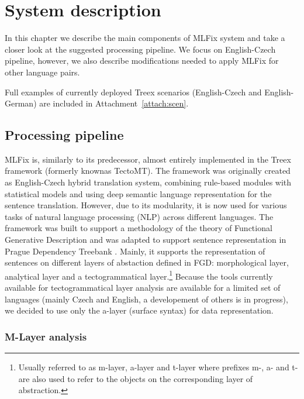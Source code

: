\chapter{System description}
\label{chap:system_descr}

In this chapter we describe the main components
of MLFix system and take a closer look at the suggested processing pipeline.
We focus on English-Czech pipeline, however, we also describe modifications
needed to apply MLFix for other language pairs.

Full examples of currently deployed Treex scenarios (English-Czech and English-German)
are included in Attachment~\ref{attach:scen}.


\section{Processing pipeline}

MLFix is, similarly to its predecessor, almost entirely implemented in the
Treex \citep{Popel:2010:TMN:1884371.1884406}
framework (formerly knownas TectoMT).
The framework was originally created as English-Czech hybrid translation system, combining
rule-based modules with statistical models and using deep semantic language representation
for the sentence translation. However, due to its modularity, it is
now used for various tasks of natural language processing (NLP) across different
languages. The framework was built to support a methodology of the theory of Functional Generative Description \citep{Sgall1967}
and was adapted to support sentence representation in Prague Dependency Treebank \citep{pdt20:2006}.
Mainly, it supports the representation of sentences on different layers of abstaction defined in FGD: morphological layer,
analytical layer and a tectogrammatical layer.\footnote{Usually referred to as m-layer, a-layer and t-layer where prefixes m-, a- and t- are also used to refer to the objects on the corresponding layer of abstraction.}
Because the tools currently available for tectogrammatical layer analysis are available for
a limited set of languages (mainly Czech and English, a developement of others is in progress),
we decided to use only the a-layer (surface syntax) for data representation.

\subsection{M-Layer analysis}

